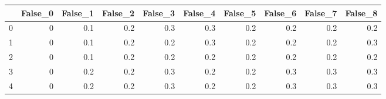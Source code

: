 \begin{tabular}{lrrrrrrrrr}
\toprule
{} &  False\_0 &  False\_1 &  False\_2 &  False\_3 &  False\_4 &  False\_5 &  False\_6 &  False\_7 &  False\_8 \\ \hline
\midrule
0 &        0 &      0.1 &      0.2 &      0.3 &      0.3 &      0.2 &      0.2 &      0.2 &      0.2 \\ \hline
1 &        0 &      0.1 &      0.2 &      0.2 &      0.3 &      0.2 &      0.2 &      0.2 &      0.3 \\ \hline
2 &        0 &      0.1 &      0.2 &      0.2 &      0.2 &      0.2 &      0.2 &      0.2 &      0.2 \\ \hline
3 &        0 &      0.2 &      0.2 &      0.3 &      0.2 &      0.2 &      0.3 &      0.3 &      0.3 \\ \hline
4 &        0 &      0.2 &      0.2 &      0.3 &      0.2 &      0.2 &      0.3 &      0.3 &      0.3 \\ \hline
\bottomrule
\end{tabular}
